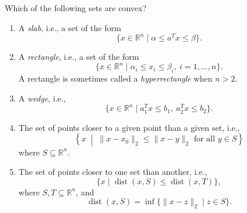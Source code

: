 \documentclass[11pt,letter,notitlepage]{article}
\theoremstyle{definition}
\begin{document}
\newpage

\begin{exercise}[ ]
Which of the following sets are convex?

\begin{enumerate}
    \item[(a)] A \emph{slab}, i.e., a set of the form
    \[
    \{x \in \mathbb{R}^n \mid \alpha \le a^T x \le \beta\}.
    \]

    \item[(b)] A \emph{rectangle}, i.e., a set of the form
    \[
    \{x \in \mathbb{R}^n \mid \alpha_i \le x_i \le \beta_i,\ i=1,\dots,n\}.
    \]
    A rectangle is sometimes called a \emph{hyperrectangle} when \(n>2\).

    \item[(c)] A \emph{wedge}, i.e.,
    \[
    \{x \in \mathbb{R}^n \mid a_1^T x \le b_1,\ a_2^T x \le b_2\}.
    \]

    \item[(d)] The set of points closer to a given point than a given set, i.e.,
    \[
    \left\{x \;\middle|\; \|x-x_0\|_2 \le \|x-y\|_2 \text{ for all } y \in S\right\}
    \]
    where \(S \subseteq \mathbb{R}^n\).

    \item[(e)] The set of points closer to one set than another, i.e.,
    \[
    \{x \mid \operatorname{dist}(x,S) \le \operatorname{dist}(x,T)\},
    \]
    where \(S,T \subseteq \mathbb{R}^n\), and
    \[
    \operatorname{dist}(x,S)=\inf\{\|x-z\|_2 \mid z \in S\}.
    \]
\end{enumerate}
\end{exercise}

\newpage
\end{document}
